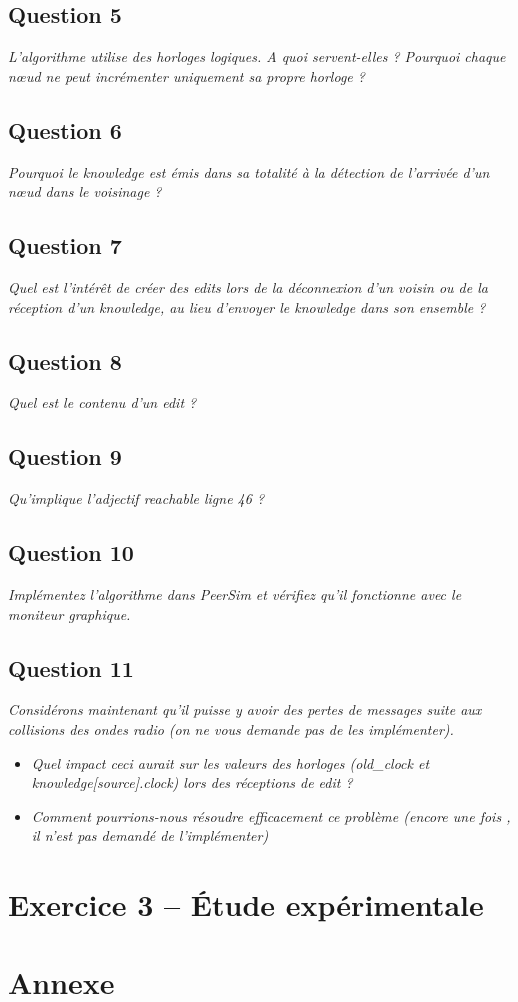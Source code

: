 \documentclass[11pt,a4paper,sans]{report}
\begin{document}
\section{Question 5}
\textit{L’algorithme utilise des horloges logiques. A quoi servent-elles ?  Pourquoi chaque nœud ne peut incrémenter uniquement sa propre horloge ?}
\section{Question 6}
\textit{Pourquoi le knowledge est émis dans sa totalité à la détection de l’arrivée d’un nœud dans le voisinage ?}
\section{Question 7}
\textit{Quel est l’intérêt de créer des edits lors de la déconnexion d’un voisin ou de la réception d’un knowledge, au lieu d’envoyer le knowledge dans son ensemble ?}
\section{Question 8}
\textit{Quel est le contenu d’un edit ?}
\section{Question 9}
\textit{Qu’implique l’adjectif reachable ligne 46 ?}
\section{Question 10}
\textit{Implémentez l’algorithme dans PeerSim et vérifiez qu’il fonctionne avec le moniteur graphique.}
\section{Question 11}
\textit{Considérons maintenant qu’il puisse y avoir des pertes de messages suite aux collisions des ondes radio (on ne vous demande pas de les implémenter).}
\begin{itemize}
\item \textit{Quel impact ceci aurait sur les valeurs des horloges (old\_clock et knowledge[source].clock) lors des réceptions de edit ?}
\item \textit{Comment pourrions-nous résoudre efficacement ce problème (encore une fois , il n’est pas demandé de l’implémenter)}
\end{itemize}

\newpage
\chapter{Exercice 3 – Étude expérimentale}

\newpage



\newpage
\chapter{Annexe}
\end{document}
